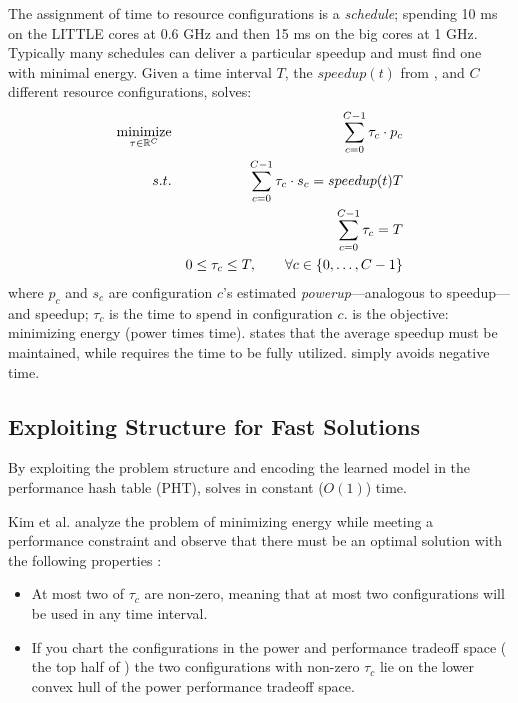 The assignment of time to resource configurations is a
\emph{schedule}; \eg{} spending 10 ms on the LITTLE cores at 0.6 GHz
and then 15 ms on the big cores at 1 GHz. Typically many schedules can
deliver a particular speedup and \SYSTEM{} must find one with minimal
energy.  Given a time interval $T$, the $speedup(t)$ from
, and $C$ different resource configurations,
\SYSTEM{} solves:
\begin{eqnarray}
  \minimize_{\mathbf{\tau} \in \R^{C}} && \sum_{c=0}^{C-1} \tau_c \cdot p_c \label{eqn:power}  \\
  \st %
  && \sum_{c=0}^{C-1} \tau_c \cdot s_c =  speedup(t)T \label{eqn:work} \\
  && \sum_{c=0}^{C-1} \tau_c =  T \label{eqn:deadline} \\
  && 0 \le \tau_c \le T, \qquad \forall c \in \{0,\ldots,C-1\} \label{eqn:time}
\end{eqnarray}
where $p_c$ and $s_c$ are configuration $c$'s estimated
\emph{powerup}---analogous to speedup---and speedup; $\tau_c$ is the
time to spend in configuration $c$.   is the objective:
minimizing energy (power times time).   states that the
average speedup must be maintained, while  requires
the time to be fully utilized.   simply avoids negative
time.

\subsection{Exploiting Structure for Fast Solutions}
By exploiting the problem structure and encoding the learned model in
the performance hash table (PHT), \SYSTEM{} solves
 in constant ($O(1)$) time.

Kim et al. analyze the problem of minimizing energy while meeting a
performance constraint and observe that there must be an optimal
solution with the following properties \cite{kim-cpsna}:
\begin{itemize}[leftmargin=1em]
\item At most two of $\tau_c$ are non-zero, meaning that at most two
  configurations will be used in any time interval.
\item If you chart the configurations in the power and performance
  tradeoff space (\eg{} the top half of ) the two
  configurations with non-zero $\tau_c$ lie on the lower convex hull
  of the power performance tradeoff space.
\end{itemize}

